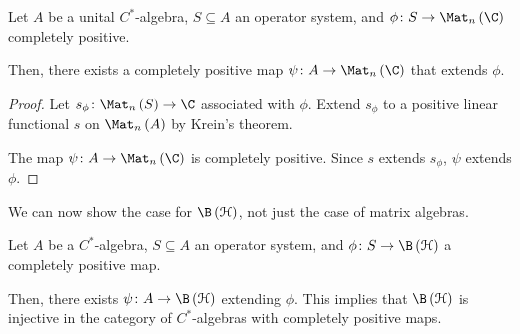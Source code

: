 \documentclass[10pt]{mypackage}
\begin{document}
\begin{theorem}
  Let $A$ be a unital $C^{\ast}$-algebra, $S\subseteq A$ an operator system, and $\phi\colon S\rightarrow \Mat_n\left( \C \right)$ completely positive.\newline

  Then, there exists a completely positive map $\psi\colon A\rightarrow \Mat_n\left( \C \right)$ that extends $\phi$.
\end{theorem}
\begin{proof}
  Let $s_{\phi}\colon \Mat_n\left( S \right)\rightarrow \C$ associated with $\phi$. Extend $s_{\phi}$ to a positive linear functional $s$ on $\Mat_n\left( A \right)$ by Krein's theorem.\newline

  The map $\psi\colon A\rightarrow \Mat_n\left( \C \right)$ is completely positive. Since $s$ extends $s_{\phi}$, $\psi$ extends $\phi$.
\end{proof}
We can now show the case for $\B\left( \mathcal{H} \right)$, not just the case of matrix algebras.
\begin{theorem}
  Let $A$ be a $C^{\ast}$-algebra, $S\subseteq A$ an operator system, and $\phi\colon S\rightarrow \B\left( \mathcal{H} \right)$ a completely positive map.\newline

  Then, there exists $\psi\colon A\rightarrow \B\left( \mathcal{H} \right)$ extending $\phi$. This implies that $\B\left( \mathcal{H} \right)$ is injective in the category of $C^{\ast}$-algebras with completely positive maps.
  \begin{center}
  \end{center}
\end{theorem}
\end{document}
